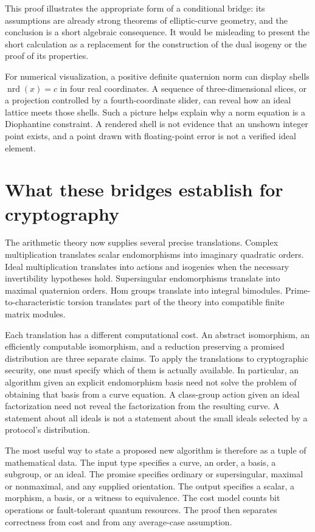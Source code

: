 This proof illustrates the appropriate form of a conditional
bridge: its assumptions are already strong theorems of
elliptic-curve geometry, and the conclusion is a short algebraic
consequence. It would be misleading to present the short
calculation as a replacement for the construction of the dual
isogeny or the proof of its properties.

For numerical visualization, a positive definite quaternion
norm can display shells $\operatorname{nrd}(x)=c$ in four
real coordinates. A sequence of three-dimensional slices, or a
projection controlled by a fourth-coordinate slider, can reveal
how an ideal lattice meets those shells. Such a picture helps
explain why a norm equation is a Diophantine constraint. A
rendered shell is not evidence that an unshown integer point
exists, and a point drawn with floating-point error is not a
verified ideal element.

\section{What these bridges establish for cryptography}

The arithmetic theory now supplies several precise translations.
Complex multiplication translates scalar endomorphisms into
imaginary quadratic orders. Ideal multiplication translates into
actions and isogenies when the necessary invertibility hypotheses
hold. Supersingular endomorphisms translate into maximal
quaternion orders. Hom groups translate into integral bimodules.
Prime-to-characteristic torsion translates part of the theory
into compatible finite matrix modules.

Each translation has a different computational cost. An abstract
isomorphism, an efficiently computable isomorphism, and a reduction
preserving a promised distribution are three separate claims.
To apply the translations to cryptographic security, one must
specify which of them is actually available. In particular, an
algorithm given an explicit endomorphism basis need not solve
the problem of obtaining that basis from a curve equation. A
class-group action given an ideal factorization need not reveal
the factorization from the resulting curve. A statement about
all ideals is not a statement about the small ideals selected
by a protocol's distribution.

The most useful way to state a proposed new algorithm is therefore
as a tuple of mathematical data. The input type specifies a curve,
an order, a basis, a subgroup, or an ideal. The promise specifies
ordinary or supersingular, maximal or nonmaximal, and any supplied
orientation. The output specifies a scalar, a morphism, a basis,
or a witness to equivalence. The cost model counts bit operations
or fault-tolerant quantum resources. The proof then separates
correctness from cost and from any average-case assumption.

